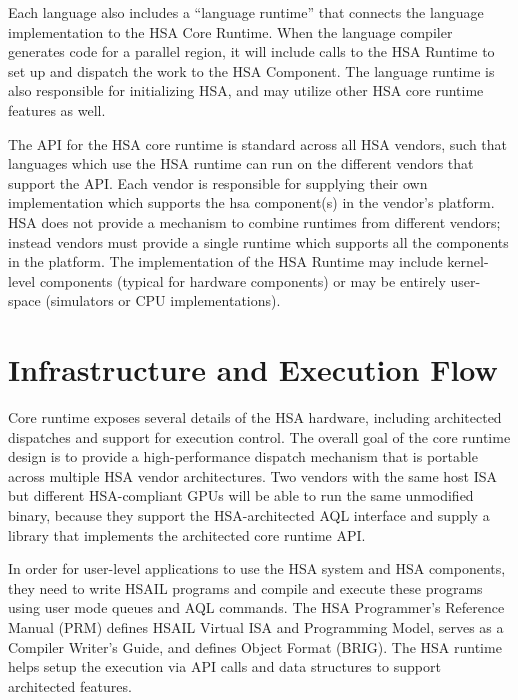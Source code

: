 Each language also includes a “language runtime” that connects the
language implementation to the HSA Core Runtime.   When the language
compiler generates code for a parallel region, it will include calls
to the HSA Runtime to set up and dispatch the work to the HSA
Component.   The language runtime is also responsible for
initializing HSA, and may utilize other HSA core runtime features as
well.  

The API for the HSA core runtime is standard across all HSA vendors,
such that languages which use the HSA runtime can run on the
different vendors that support the API.  Each vendor is responsible
for supplying their own implementation which supports the hsa
component(s) in the vendor’s platform.   HSA does not provide a
mechanism to combine runtimes from different vendors; instead
vendors must provide a single runtime which supports all the
components in the platform.
The implementation of the HSA Runtime may include kernel-level
components (typical for hardware components) or may be entirely
user-space (simulators or CPU implementations).     

\hypertarget{glue}{}\section{ Infrastructure and Execution
Flow}\label{glue}


Core runtime exposes several details of the HSA hardware,
including architected dispatches and support for execution control.
The overall goal of the core runtime design is to provide a
high-\/performance dispatch mechanism that is portable across
multiple H\-S\-A vendor architectures. Two vendors with the same
host I\-S\-A but different H\-S\-A-\/compliant G\-P\-Us will be able
to run the same unmodified binary, because they support the
H\-S\-A-\/architected A\-Q\-L interface and supply a library
that implements the architected core runtime A\-P\-I. 

In order for user-level applications to use the HSA system and HSA
components, they need to write HSAIL programs and compile and
execute these programs using user mode queues and AQL commands.  The
HSA Programmer’s Reference Manual (PRM) defines HSAIL Virtual ISA
and Programming Model, serves as a Compiler Writer’s Guide, and
defines Object Format (BRIG). The HSA runtime helps setup the
execution via API calls and data structures to support architected
features.

